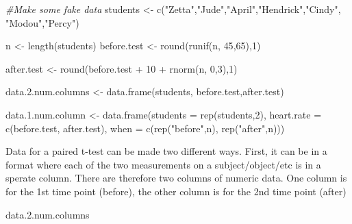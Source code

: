 \documentclass[
]{book}
\newenvironment{Shaded}{\begin{snugshade}}{\end{snugshade}}
\newcommand{\AttributeTok}[1]{\textcolor[rgb]{0.77,0.63,0.00}{#1}}
\newcommand{\CommentTok}[1]{\textcolor[rgb]{0.56,0.35,0.01}{\textit{#1}}}
\newcommand{\DecValTok}[1]{\textcolor[rgb]{0.00,0.00,0.81}{#1}}
\newcommand{\FloatTok}[1]{\textcolor[rgb]{0.00,0.00,0.81}{#1}}
\newcommand{\FunctionTok}[1]{\textcolor[rgb]{0.00,0.00,0.00}{#1}}
\newcommand{\NormalTok}[1]{#1}
\newcommand{\OtherTok}[1]{\textcolor[rgb]{0.56,0.35,0.01}{#1}}
\newcommand{\SpecialCharTok}[1]{\textcolor[rgb]{0.00,0.00,0.00}{#1}}
\newcommand{\StringTok}[1]{\textcolor[rgb]{0.31,0.60,0.02}{#1}}
\begin{document}
\begin{Shaded}
\begin{Highlighting}[]
\CommentTok{\#Make some fake data}
\NormalTok{students }\OtherTok{\textless{}{-}} \FunctionTok{c}\NormalTok{(}\StringTok{"Zetta"}\NormalTok{,}\StringTok{"Jude"}\NormalTok{,}\StringTok{"April"}\NormalTok{,}\StringTok{"Hendrick"}\NormalTok{,}\StringTok{"Cindy"}\NormalTok{, }\StringTok{"Modou"}\NormalTok{,}\StringTok{"Percy"}\NormalTok{)}

\NormalTok{n }\OtherTok{\textless{}{-}} \FunctionTok{length}\NormalTok{(students)}
\NormalTok{before.test }\OtherTok{\textless{}{-}} \FunctionTok{round}\NormalTok{(}\FunctionTok{runif}\NormalTok{(n, }\DecValTok{45}\NormalTok{,}\DecValTok{65}\NormalTok{),}\DecValTok{1}\NormalTok{)}

\NormalTok{after.test }\OtherTok{\textless{}{-}} \FunctionTok{round}\NormalTok{(before.test }\SpecialCharTok{+} \DecValTok{10} \SpecialCharTok{+} 
                      \FunctionTok{rnorm}\NormalTok{(n, }\DecValTok{0}\NormalTok{,}\DecValTok{3}\NormalTok{),}\DecValTok{1}\NormalTok{)}

\NormalTok{data.}\FloatTok{2.}\NormalTok{num.columns }\OtherTok{\textless{}{-}} \FunctionTok{data.frame}\NormalTok{(students, before.test,after.test)}


\NormalTok{data.}\FloatTok{1.}\NormalTok{num.column }\OtherTok{\textless{}{-}} \FunctionTok{data.frame}\NormalTok{(}\AttributeTok{students =} \FunctionTok{rep}\NormalTok{(students,}\DecValTok{2}\NormalTok{),}
\AttributeTok{heart.rate =} \FunctionTok{c}\NormalTok{(before.test, after.test),}
\AttributeTok{when =} \FunctionTok{c}\NormalTok{(}\FunctionTok{rep}\NormalTok{(}\StringTok{"before"}\NormalTok{,n), }\FunctionTok{rep}\NormalTok{(}\StringTok{"after"}\NormalTok{,n)))}
\end{Highlighting}
\end{Shaded}

Data for a paired t-test can be made two different ways. First, it can be in a format where each of the two measurements on a subject/object/etc is in a sperate column. There are therefore two columns of numeric data. One column is for the 1st time point (before), the other column is for the 2nd time point (after)

\begin{Shaded}
\begin{Highlighting}[]
\NormalTok{data.}\FloatTok{2.}\NormalTok{num.columns}
\end{Highlighting}
\end{Shaded}
\end{document}
